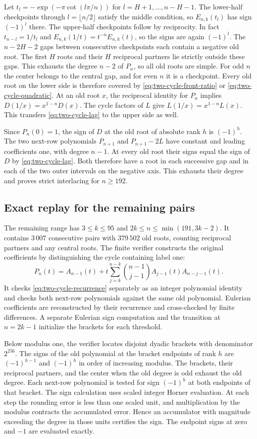 Let $t_l=-\exp(-\pi\cot(l\pi/n))$ for
$l=H+1,\ldots,n-H-1$. The lower-half checkpoints through
$l=\lfloor n/2\rfloor$ satisfy the middle condition,
so $E_{n,k}(t_l)$ has sign $(-1)^l$ there. The upper-half
checkpoints follow by reciprocity. In fact
$t_{n-l}=1/t_l$ and $E_{n,k}(1/t)=t^{-n}E_{n,k}(t)$,
so the signs are again $(-1)^l$.
The $n-2H-2$ gaps between consecutive checkpoints each contain a
negative old root. The first $H$ roots and their $H$ reciprocal
partners lie strictly outside these gaps. This exhausts the degree
$n-2$ of $P_n$, so all old roots are simple.
For odd $n$ the center belongs to the central gap, and for even $n$
it is a checkpoint. Every old root on the lower side is therefore
covered by \eqref{eq:two-cycle-front-ratio} or
\eqref{eq:two-cycle-quadratic}. At an old root $x$, the reciprocal
identity for $P_n$ implies $D(1/x)=x^{1-n}D(x)$.
The cycle factors of $L$ give $L(1/x)=x^{1-n}L(x)$.
This transfers \eqref{eq:two-cycle-lag} to the upper side as well.

Since $P_n(0)=1$, the sign of $D$ at the old root of absolute rank
$h$ is $(-1)^h$. The two next-row polynomials $P_{n+1}$ and
$P_{n+1}-2L$ have constant and leading coefficients one, with
degree $n-1$. At every old root their signs equal the sign of $D$
by \eqref{eq:two-cycle-lag}. Both therefore have a root in each
successive gap and in each of the two outer intervals on the
negative axis. This exhausts their degree and proves strict
interlacing for $n\ge192$.

\subsection{Exact replay for the remaining pairs}

The remaining range has $3\le k\le95$ and
$2k\le n\le\min(191,3k-2)$. It contains $3\,007$ consecutive pairs
with $379\,502$ old roots, counting reciprocal partners and any
central roots. The finite verifier constructs the original coefficients
by distinguishing the cycle containing label one:
\[
 P_n(t)=A_{n-1}(t)+t\sum_{j=k}^{n-k}
              \binom{n-1}{j-1}A_{j-1}(t)A_{n-j-1}(t).
\]
It checks \eqref{eq:two-cycle-recurrence} separately as an integer
polynomial identity and checks both next-row polynomials against the
same old polynomial. Eulerian coefficients are reconstructed by their
recurrence and cross-checked by finite differences. A separate
Eulerian sign computation and the transition at $n=2k-1$ initialize the
brackets for each threshold.

Below modulus one, the verifier locates disjoint dyadic brackets
with denominator $2^{256}$. The signs of the old polynomial at the
bracket endpoints of rank $h$ are $(-1)^{h-1}$ and $(-1)^h$ in
order of increasing modulus. The brackets, their reciprocal partners,
and the center when the old degree is odd exhaust the old degree.
Each next-row polynomial is tested for sign $(-1)^h$ at both endpoints of that bracket. The sign
calculation uses scaled integer Horner evaluation. At each step the
rounding error is less than one scaled unit, and multiplication
by the modulus contracts the accumulated error. Hence an accumulator
with magnitude exceeding the degree in those units certifies the sign.
The endpoint signs at zero and $-1$ are evaluated exactly.

